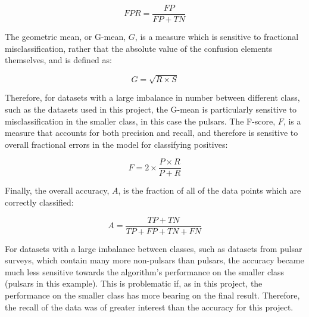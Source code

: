 \documentclass[12pt]{article}
\begin{document}
\begin{equation}
FPR = \frac{FP}{FP + TN}
\label{FPR}
\end{equation}

The geometric mean, or G-mean, $G$, is a measure which is sensitive to fractional misclassification, rather that the absolute value of the confusion elements themselves, \cite{kubat1998machine} and is defined as:

\begin{equation}
G = \sqrt{R \times S}
\label{gmean}
\end{equation}

Therefore, for datasets with a large imbalance in number between different class, such as the datasets used in this project, the G-mean is particularly sensitive to misclassification in the smaller class, in this case the pulsars. The F-score, $F$, is a measure that accounts for both precision and recall, and therefore is sensitive to overall fractional errors in the model for classifying positives:

\begin{equation}
F = 2 \times \frac{P \times R}{P+R}
\label{fscore}
\end{equation}

Finally, the overall accuracy, $A$, is the fraction of all of the data points which are correctly classified:

\begin{equation}
A = \frac{TP+TN}{TP+FP+TN+FN}
\label{accu}
\end{equation}

For datasets with a large imbalance between classes, such as datasets from pulsar surveys, which contain many more non-pulsars than pulsars, the accuracy became much less sensitive towards the algorithm's performance on the smaller class (pulsars in this example). This is problematic if, as in this project, the performance on the smaller class has more bearing on the final result. Therefore, the recall of the data was of greater interest than the accuracy for this project.
\end{document}
